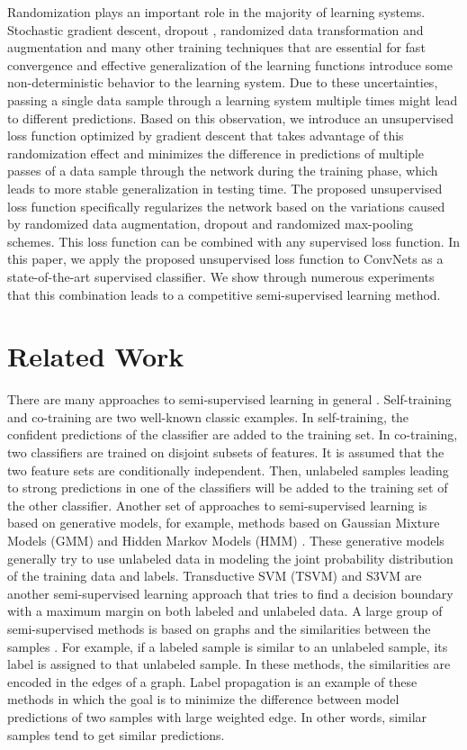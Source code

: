 \documentclass{article}
\begin{document}
Randomization plays an important role in the majority of learning systems. Stochastic gradient descent, dropout \cite{hinton2012improving}, randomized data transformation and augmentation \cite{ciresan2012multi} and many other training techniques that are essential for fast convergence and effective generalization of the learning functions introduce some non-deterministic behavior to the learning system. Due to these uncertainties, passing a single data sample through a learning system multiple times might lead to different predictions. Based on this observation, we introduce an unsupervised loss function optimized by gradient descent that takes advantage of this randomization effect and minimizes the difference in predictions of multiple passes of a data sample through the network during the training phase, which leads to more stable generalization in testing time. The proposed unsupervised loss function specifically regularizes the network based on the variations caused by randomized data augmentation, dropout and randomized max-pooling schemes. This loss function can be combined with any supervised loss function. In this paper, we apply the proposed unsupervised loss function to ConvNets as a state-of-the-art supervised classifier. We show through numerous experiments that this combination leads to a competitive semi-supervised learning method.

\section{Related Work}
\label{sec::rel}
There are many approaches to semi-supervised learning in general \cite{chapelle2006semi, zhu2005semi}. Self-training and co-training \cite{blum1998combining, de1994learning} are two well-known classic examples. In self-training, the confident predictions of the classifier are added to the training set. In co-training, two classifiers are trained on disjoint subsets of features. It is assumed that the two feature sets are conditionally independent. Then, unlabeled samples leading to strong predictions in one of the classifiers will be added to the training set of the other classifier. Another set of approaches to semi-supervised learning is based on generative models, for example, methods based on Gaussian Mixture Models (GMM) and Hidden Markov Models (HMM) \cite{miller1997mixture}. These generative models generally try to use unlabeled data in modeling the joint probability distribution of the training data and labels. Transductive SVM (TSVM) \cite{joachims1999transductive} and S3VM \cite{bennett1999semi} are another semi-supervised learning approach that tries to find a decision boundary with a maximum margin on both labeled and unlabeled data. A large group of semi-supervised methods is based on graphs and the similarities between the samples \cite{blum2001learning, zhu2003semi}. For example, if a labeled sample is similar to an unlabeled sample, its label is assigned to that unlabeled sample. In these methods, the similarities are encoded in the edges of a graph. Label propagation \cite{zhu2002learning} is an example of these methods in which the goal is to minimize the difference between model predictions of two samples with large weighted edge. In other words, similar samples tend to get similar predictions. 
\end{document}
